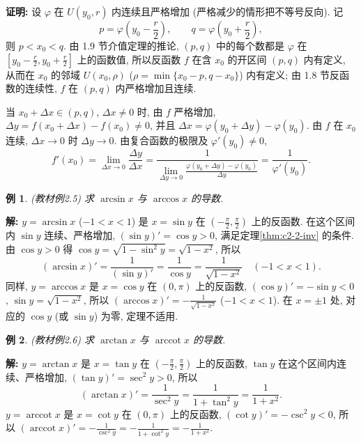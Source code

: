 \documentclass[UTF8,openany]{ctexbook}
\theoremstyle{chinesetextbook}
\newtheorem{example}{例}[section]
\newenvironment{cnproof}{\par\indent\textbf{证明:} \ignorespaces}{\par}
\newenvironment{cnsolution}{\par\indent\textbf{解:} \ignorespaces}{\par}
\begin{document}
\begin{cnproof}
设 $\varphi$ 在 $U(y_0,r)$ 内连续且严格增加 (严格减少的情形把不等号反向). 记
\[
p=\varphi\left(y_0-\frac r2\right),\qquad q=\varphi\left(y_0+\frac r2\right),
\]
则 $p<x_0<q$. 由 1.9 节介值定理的推论, $(p,q)$ 中的每个数都是 $\varphi$ 在 $\displaystyle\left[y_0-\frac r2,y_0+\frac r2\right]$ 上的函数值, 所以反函数 $f$ 在含 $x_0$ 的开区间 $(p,q)$ 内有定义, 从而在 $x_0$ 的邻域 $U(x_0,\rho)$ ($\rho=\min\{x_0-p,q-x_0\}$) 内有定义; 由 1.8 节反函数的连续性, $f$ 在 $(p,q)$ 内严格增加且连续.

当 $x_0+\Delta x\in(p,q)$, $\Delta x\ne0$ 时, 由 $f$ 严格增加, $\Delta y=f(x_0+\Delta x)-f(x_0)\ne0$, 并且 $\Delta x=\varphi(y_0+\Delta y)-\varphi(y_0)$. 由 $f$ 在 $x_0$ 连续, $\Delta x\to0$ 时 $\Delta y\to0$. 由复合函数的极限及 $\varphi'(y_0)\ne0$,
\[
f'(x_0)=\lim_{\Delta x\to0}\frac{\Delta y}{\Delta x}=\frac1{\displaystyle\lim_{\Delta y\to0}\frac{\varphi(y_0+\Delta y)-\varphi(y_0)}{\Delta y}}=\frac1{\varphi'(y_0)}.
\]
\end{cnproof}
\begin{example}\label{ex:c2-2-5}
\textnormal{(教材例2.5)} 求 $\arcsin x$ 与 $\arccos x$ 的导数.
\end{example}
\begin{cnsolution}
$y=\arcsin x$ ($-1<x<1$) 是 $x=\sin y$ 在 $\displaystyle\left(-\frac\pi2,\frac\pi2\right)$ 上的反函数. 在这个区间内 $\sin y$ 连续、严格增加, $(\sin y)'=\cos y>0$, 满足定理\ref{thm:c2-2-inv} 的条件. 由 $\cos y>0$ 得 $\cos y=\sqrt{1-\sin^2y}=\sqrt{1-x^2}$, 所以
\[
(\arcsin x)'=\frac1{(\sin y)'}=\frac1{\cos y}=\frac1{\sqrt{1-x^2}}\quad(-1<x<1).
\]
同样, $y=\arccos x$ 是 $x=\cos y$ 在 $(0,\pi)$ 上的反函数, $(\cos y)'=-\sin y<0$, $\sin y=\sqrt{1-x^2}$, 所以 $\displaystyle(\arccos x)'=-\frac1{\sqrt{1-x^2}}$ ($-1<x<1$). 在 $x=\pm1$ 处, 对应的 $\cos y$ (或 $\sin y$) 为零, 定理不适用.
\end{cnsolution}
\begin{example}\label{ex:c2-2-6}
\textnormal{(教材例2.6)} 求 $\arctan x$ 与 $\operatorname{arccot}x$ 的导数.
\end{example}
\begin{cnsolution}
$y=\arctan x$ 是 $x=\tan y$ 在 $\displaystyle\left(-\frac\pi2,\frac\pi2\right)$ 上的反函数, $\tan y$ 在这个区间内连续、严格增加, $(\tan y)'=\sec^2y>0$, 所以
\[
(\arctan x)'=\frac1{\sec^2y}=\frac1{1+\tan^2y}=\frac1{1+x^2}.
\]
$y=\operatorname{arccot}x$ 是 $x=\cot y$ 在 $(0,\pi)$ 上的反函数, $(\cot y)'=-\csc^2y<0$, 所以 $\displaystyle(\operatorname{arccot}x)'=-\frac1{\csc^2y}=-\frac1{1+\cot^2y}=-\frac1{1+x^2}$.
\end{cnsolution}
\end{document}
